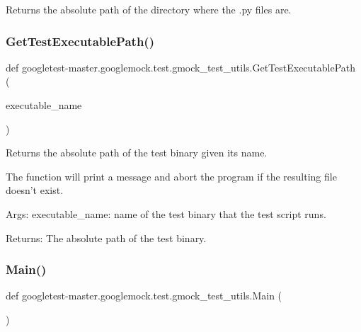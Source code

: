 \begin{DoxyVerb}Returns the absolute path of the directory where the .py files are.\end{DoxyVerb}
 \mbox{\label{namespacegoogletest-master_1_1googlemock_1_1test_1_1gmock__test__utils_a96f12a02ddad3510eb506e45a7aeb27b}} 
\subsubsection{\texorpdfstring{GetTestExecutablePath()}{GetTestExecutablePath()}}
{\footnotesize\ttfamily def googletest-\/master.\+googlemock.\+test.\+gmock\+\_\+test\+\_\+utils.\+Get\+Test\+Executable\+Path (\begin{DoxyParamCaption}\item[{}]{executable\+\_\+name }\end{DoxyParamCaption})}

\begin{DoxyVerb}Returns the absolute path of the test binary given its name.

The function will print a message and abort the program if the resulting file
doesn't exist.

Args:
  executable_name: name of the test binary that the test script runs.

Returns:
  The absolute path of the test binary.
\end{DoxyVerb}
 \mbox{\label{namespacegoogletest-master_1_1googlemock_1_1test_1_1gmock__test__utils_a66f3908daa336c8cc507730bcd64bb5f}} 
\subsubsection{\texorpdfstring{Main()}{Main()}}
{\footnotesize\ttfamily def googletest-\/master.\+googlemock.\+test.\+gmock\+\_\+test\+\_\+utils.\+Main (\begin{DoxyParamCaption}{ }\end{DoxyParamCaption})}

